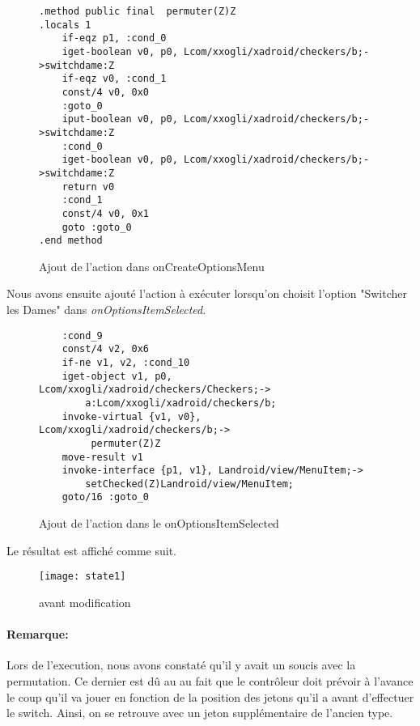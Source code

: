 \begin{figure}[!hp]
\begin{verbatim}
.method public final  permuter(Z)Z
.locals 1
    if-eqz p1, :cond_0
    iget-boolean v0, p0, Lcom/xxogli/xadroid/checkers/b;->switchdame:Z
    if-eqz v0, :cond_1
    const/4 v0, 0x0
    :goto_0
    iput-boolean v0, p0, Lcom/xxogli/xadroid/checkers/b;->switchdame:Z
    :cond_0
    iget-boolean v0, p0, Lcom/xxogli/xadroid/checkers/b;->switchdame:Z
    return v0
    :cond_1
    const/4 v0, 0x1
    goto :goto_0
.end method
\end{verbatim}
    \caption{Ajout de l'action dans onCreateOptionsMenu}
\end{figure}

Nous avons ensuite ajouté l'action à exécuter lorsqu'on choisit l'option "Switcher les Dames" dans \textit{onOptionsItemSelected}.

\begin{figure}[!hp]
\begin{verbatim}
    :cond_9
    const/4 v2, 0x6
    if-ne v1, v2, :cond_10
    iget-object v1, p0, Lcom/xxogli/xadroid/checkers/Checkers;->
        a:Lcom/xxogli/xadroid/checkers/b;
    invoke-virtual {v1, v0}, Lcom/xxogli/xadroid/checkers/b;->
         permuter(Z)Z
    move-result v1
    invoke-interface {p1, v1}, Landroid/view/MenuItem;->
        setChecked(Z)Landroid/view/MenuItem;
    goto/16 :goto_0
\end{verbatim}
    \caption{Ajout de l'action dans le onOptionsItemSelected}
\end{figure}

\newpage

Le résultat est affiché comme suit.

\begin{figure}[h!]
	      \begin{center}
			\texttt{[image: state1]}
	      \end{center}
	\caption{avant modification}
\end{figure}


\paragraph{Remarque:}
Lors de l'execution, nous avons constaté qu'il y avait un soucis avec la permutation.
Ce dernier est dû au au fait que le contrôleur doit prévoir à l'avance le coup qu'il va jouer en fonction
de la position des jetons qu'il a avant d'effectuer le switch.
Ainsi, on se retrouve avec un jeton supplémentaire de l'ancien type.

